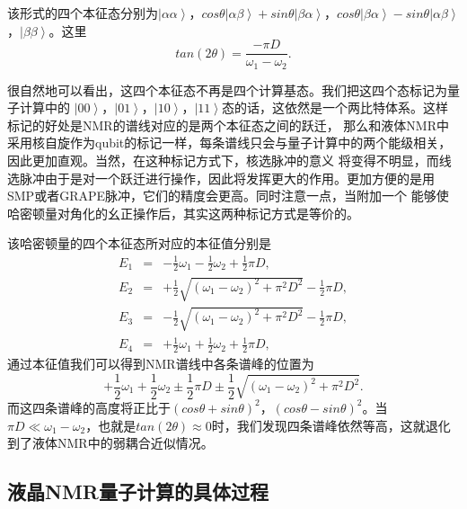 该形式的四个本征态分别为$\left \vert \alpha\alpha \right \rangle$，$cos\theta \left \vert \alpha\beta \right \rangle+sin\theta \left \vert \beta\alpha \right \rangle$，$cos\theta \left \vert \beta\alpha \right \rangle-sin\theta \left \vert \alpha\beta \right \rangle$，$\left \vert\beta\beta \right \rangle$。这里
\begin{equation}\label{aaa}
tan(2\theta) = \frac{-\pi D}{\omega_1-\omega_2}.
\end{equation}

很自然地可以看出，这四个本征态不再是四个计算基态。我们把这四个态标记为量子计算中的
$\left \vert 00 \right \rangle$，$\left \vert 01 \right \rangle$，$\left \vert 10 \right \rangle$，$\left \vert11 \right \rangle$态的话，这依然是一个两比特体系。这样标记的好处是NMR的谱线对应的是两个本征态之间的跃迁，
那么和液体NMR中采用核自旋作为qubit的标记一样，每条谱线只会与量子计算中的两个能级相关，因此更加直观。当然，在这种标记方式下，核选脉冲的意义
将变得不明显，而线选脉冲由于是对一个跃迁进行操作，因此将发挥更大的作用。更加方便的是用SMP或者GRAPE脉冲，它们的精度会更高。同时注意一点，当附加一个
能够使哈密顿量对角化的幺正操作后，其实这两种标记方式是等价的。

该哈密顿量的四个本征态所对应的本征值分别是
\begin{eqnarray}\label{aaa}
E_1  &=& -\frac{1}{2}\omega_1 -\frac{1}{2}\omega_2+\frac{1}{2}\pi D, \nonumber \\
E_2& =& +\frac{1}{2} \sqrt{(\omega_1 - \omega_2)^2+\pi^2D^2}-\frac{1}{2}\pi D, \nonumber \\
E_3& =& -\frac{1}{2}\sqrt{(\omega_1 - \omega_2)^2+\pi^2D^2}-\frac{1}{2}\pi D, \nonumber \\
E_4 & =& +\frac{1}{2}\omega_1 +\frac{1}{2}\omega_2+\frac{1}{2}\pi D,
\end{eqnarray}
通过本征值我们可以得到NMR谱线中各条谱峰的位置为
\begin{equation}\label{aaa}
 +\frac{1}{2}\omega_1 +\frac{1}{2}\omega_2\pm\frac{1}{2}\pi D \pm \frac{1}{2} \sqrt{(\omega_1 - \omega_2)^2+\pi^2D^2}.
\end{equation}
而这四条谱峰的高度将正比于$(cos\theta+sin\theta)^2$，$(cos\theta-sin\theta)^2$。当$\pi D\ll \omega_1 - \omega_2$，也就是$tan(2\theta)\approx 0 $时，我们发现四条谱峰依然等高，这就退化到了液体NMR中的弱耦合近似情况。

\subsection{液晶NMR量子计算的具体过程}



